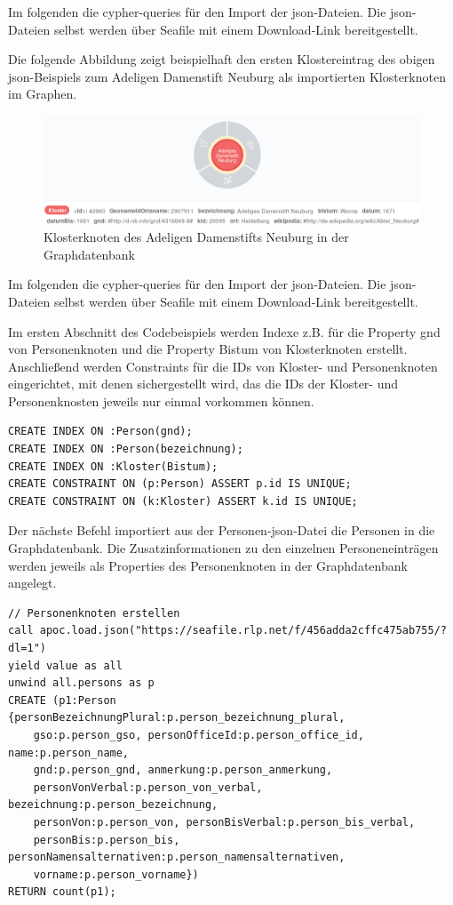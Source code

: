 \documentclass[ngerman,]{scrreprt}
\begin{document}
Im folgenden die cypher-queries für den Import der json-Dateien. Die json-Dateien selbst werden über Seafile mit einem Download-Link bereitgestellt.

Die folgende Abbildung zeigt beispielhaft den ersten Klostereintrag des obigen json-Beispiels zum Adeligen Damenstift Neuburg als importierten Klosterknoten im Graphen.

\begin{figure}
\centering
\includegraphics{Bilder/Germania-Sacra-Klosterknoten.png}
\caption{Klosterknoten des Adeligen Damenstifts Neuburg in der Graphdatenbank}
\end{figure}

Im folgenden die cypher-queries für den Import der json-Dateien. Die json-Dateien selbst werden über Seafile mit einem Download-Link bereitgestellt.

Im ersten Abschnitt des Codebeispiels werden Indexe z.B. für die Property gnd von Personenknoten und die Property Bistum von Klosterknoten erstellt. Anschließend werden Constraints für die IDs von Kloster- und Personenknoten eingerichtet, mit denen sichergestellt wird, das die IDs der Kloster- und Personenknosten jeweils nur einmal vorkommen können.

\begin{verbatim}
CREATE INDEX ON :Person(gnd);
CREATE INDEX ON :Person(bezeichnung);
CREATE INDEX ON :Kloster(Bistum);
CREATE CONSTRAINT ON (p:Person) ASSERT p.id IS UNIQUE;
CREATE CONSTRAINT ON (k:Kloster) ASSERT k.id IS UNIQUE;
\end{verbatim}

Der nächste Befehl importiert aus der Personen-json-Datei die Personen in die Graphdatenbank. Die Zusatzinformationen zu den einzelnen Personeneinträgen werden jeweils als Properties des Personenknoten in der Graphdatenbank angelegt.

\begin{verbatim}
// Personenknoten erstellen
call apoc.load.json("https://seafile.rlp.net/f/456adda2cffc475ab755/?dl=1")
yield value as all
unwind all.persons as p
CREATE (p1:Person {personBezeichnungPlural:p.person_bezeichnung_plural,
    gso:p.person_gso, personOfficeId:p.person_office_id, name:p.person_name,
    gnd:p.person_gnd, anmerkung:p.person_anmerkung,
    personVonVerbal:p.person_von_verbal, bezeichnung:p.person_bezeichnung,
    personVon:p.person_von, personBisVerbal:p.person_bis_verbal,
    personBis:p.person_bis, personNamensalternativen:p.person_namensalternativen,
    vorname:p.person_vorname})
RETURN count(p1);
\end{verbatim}
\end{document}
